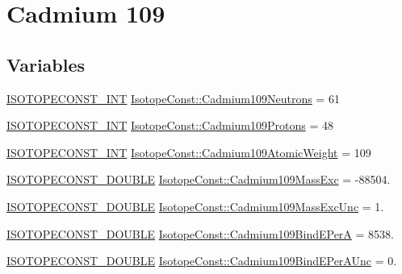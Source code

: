 \hypertarget{group___isotope_const-_cadmium-_cd109}{}\section{Cadmium 109}
\label{group___isotope_const-_cadmium-_cd109}
\subsection*{Variables}
\begin{DoxyCompactItemize}
\item 
\mbox{\hyperlink{group___isotope_const-_macros_ga5f18360b3e99483a35c32d789e62621c}{I\+S\+O\+T\+O\+P\+E\+C\+O\+N\+S\+T\+\_\+\+I\+NT}} \mbox{\hyperlink{group___isotope_const-_cadmium-_cd109_ga454cd6fe4c7e9c012d7ee8e01e043310}{Isotope\+Const\+::\+Cadmium109\+Neutrons}} = 61
\item 
\mbox{\hyperlink{group___isotope_const-_macros_ga5f18360b3e99483a35c32d789e62621c}{I\+S\+O\+T\+O\+P\+E\+C\+O\+N\+S\+T\+\_\+\+I\+NT}} \mbox{\hyperlink{group___isotope_const-_cadmium-_cd109_ga17ad24b119b70aefd0c6960978c1ccca}{Isotope\+Const\+::\+Cadmium109\+Protons}} = 48
\item 
\mbox{\hyperlink{group___isotope_const-_macros_ga5f18360b3e99483a35c32d789e62621c}{I\+S\+O\+T\+O\+P\+E\+C\+O\+N\+S\+T\+\_\+\+I\+NT}} \mbox{\hyperlink{group___isotope_const-_cadmium-_cd109_gaa906cb9d97bae70d9074ebf53c1bbe5a}{Isotope\+Const\+::\+Cadmium109\+Atomic\+Weight}} = 109
\item 
\mbox{\hyperlink{group___isotope_const-_macros_ga8f45a7272ce02c0b4c65c44636ed719a}{I\+S\+O\+T\+O\+P\+E\+C\+O\+N\+S\+T\+\_\+\+D\+O\+U\+B\+LE}} \mbox{\hyperlink{group___isotope_const-_cadmium-_cd109_ga7372c9a80e33a6d467d3018009fa2d01}{Isotope\+Const\+::\+Cadmium109\+Mass\+Exc}} = -\/88504.
\item 
\mbox{\hyperlink{group___isotope_const-_macros_ga8f45a7272ce02c0b4c65c44636ed719a}{I\+S\+O\+T\+O\+P\+E\+C\+O\+N\+S\+T\+\_\+\+D\+O\+U\+B\+LE}} \mbox{\hyperlink{group___isotope_const-_cadmium-_cd109_gafd7232696236eeddde4285c5b6ab2d49}{Isotope\+Const\+::\+Cadmium109\+Mass\+Exc\+Unc}} = 1.
\item 
\mbox{\hyperlink{group___isotope_const-_macros_ga8f45a7272ce02c0b4c65c44636ed719a}{I\+S\+O\+T\+O\+P\+E\+C\+O\+N\+S\+T\+\_\+\+D\+O\+U\+B\+LE}} \mbox{\hyperlink{group___isotope_const-_cadmium-_cd109_ga19df11d9b99767d694f81a4b285cf981}{Isotope\+Const\+::\+Cadmium109\+Bind\+E\+PerA}} = 8538.
\item 
\mbox{\hyperlink{group___isotope_const-_macros_ga8f45a7272ce02c0b4c65c44636ed719a}{I\+S\+O\+T\+O\+P\+E\+C\+O\+N\+S\+T\+\_\+\+D\+O\+U\+B\+LE}} \mbox{\hyperlink{group___isotope_const-_cadmium-_cd109_ga431444f25cb6c25db6187356eddb0842}{Isotope\+Const\+::\+Cadmium109\+Bind\+E\+Per\+A\+Unc}} = 0.

\end{DoxyCompactItemize}
